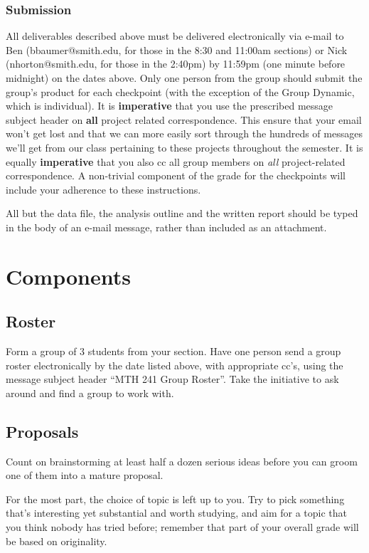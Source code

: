 \documentclass[10pt]{article}
\begin{document}
\subsubsection*{Submission}
All deliverables described above must be delivered electronically via e-mail to Ben (bbaumer@smith.edu, for those in the 8:30 and 11:00am sections) or Nick (nhorton@smith.edu, for those in the 2:40pm) by 11:59pm (one minute before midnight) on the dates above. Only one person from the group should submit the group’s product for each checkpoint (with the exception of the Group Dynamic, which is individual).
	It is {\bf imperative} that you use the prescribed message subject header on {\bf all} project related correspondence.  This ensure that your email won't get lost and that we can more easily sort through the hundreds of messages we’ll get from our class pertaining to these projects throughout the semester.  
It is equally {\bf imperative} that you also 
cc all group members on \emph{all} project-related correspondence. 
A non-trivial component of the grade for the checkpoints will include your adherence to these instructions.

	All but the data file, the analysis outline and the written report should be typed in the body of an e-mail message, rather than included as an attachment. 

\section{Components}

\subsection{Roster}

Form a group of 3 students from your section. Have one person send a group roster electronically by the date listed above, with appropriate cc's, using the message subject header “MTH 241 Group Roster”.  Take the initiative to ask around and find a group to work with.

\subsection{Proposals}

Count on brainstorming at least half a dozen serious ideas before you can groom one of them into a mature proposal. 

For the most part, the choice of topic is left up to you. Try to pick something that's interesting yet substantial and worth studying, and aim for a topic that you think nobody has tried before; remember that part of your overall grade will be based on originality.
\end{document}
